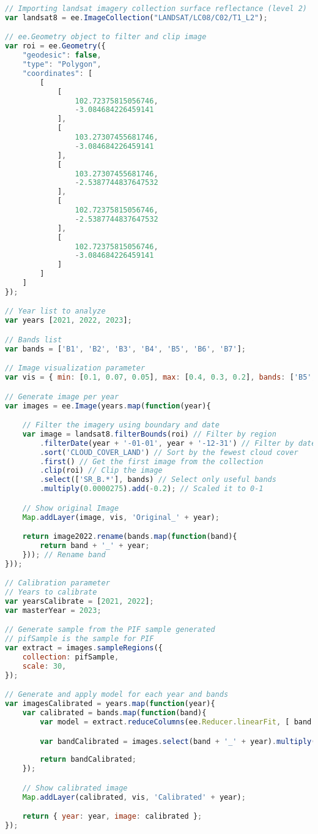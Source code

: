 \begin{lstlisting}[language=JavaScript, label={code:multitemporal}, caption={GEE Script to Preprocess Multitemporal Image}]
// Importing landsat imagery collection surface reflectance (level 2)
var landsat8 = ee.ImageCollection("LANDSAT/LC08/C02/T1_L2");

// ee.Geometry object to filter and clip image
var roi = ee.Geometry({
	"geodesic": false,
	"type": "Polygon",
	"coordinates": [
		[
			[
				102.72375815056746,
				-3.084684226459141
			],
			[
				103.27307455681746,
				-3.084684226459141
			],
			[
				103.27307455681746,
				-2.5387744837647532
			],
			[
				102.72375815056746,
				-2.5387744837647532
			],
			[
				102.72375815056746,
				-3.084684226459141
			]
		]
	]
});

// Year list to analyze
var years [2021, 2022, 2023];

// Bands list
var bands = ['B1', 'B2', 'B3', 'B4', 'B5', 'B6', 'B7'];

// Image visualization parameter
var vis = { min: [0.1, 0.07, 0.05], max: [0.4, 0.3, 0.2], bands: ['B5', 'B6', 'B7'] };

// Generate image per year
var images = ee.Image(years.map(function(year){

	// Filter the imagery using boundary and date
	var image = landsat8.filterBounds(roi) // Filter by region
		.filterDate(year + '-01-01', year + '-12-31') // Filter by date
		.sort('CLOUD_COVER_LAND') // Sort by the fewest cloud cover
		.first() // Get the first image from the collection
		.clip(roi) // Clip the image
		.select(['SR_B.*'], bands) // Select only useful bands
		.multiply(0.0000275).add(-0.2); // Scaled it to 0-1

	// Show original Image
	Map.addLayer(image, vis, 'Original_' + year);

	return image2022.rename(bands.map(function(band){
		return band + '_' + year;
	})); // Rename band
}));

// Calibration parameter
// Years to calibrate
var yearsCalibrate = [2021, 2022];
var masterYear = 2023;

// Generate sample from the PIF sample generated
// pifSample is the sample for PIF
var extract = images.sampleRegions({
	collection: pifSample,
	scale: 30,
});

// Generate and apply model for each year and bands
var imagesCalibrated = years.map(function(year){
	var calibrated = bands.map(function(band){
		var model = extract.reduceColumns(ee.Reducer.linearFit, [ band + '_' + year, band + '_' + masterYear ]);

		var bandCalibrated = images.select(band + '_' + year).multiply(ee.Number(model.get('scale'))).add(ee.Number(model.get('offset'))).rename(band);
	
		return bandCalibrated;
	});

	// Show calibrated image
	Map.addLayer(calibrated, vis, 'Calibrated' + year);

	return { year: year, image: calibrated };
});
\end{lstlisting}

